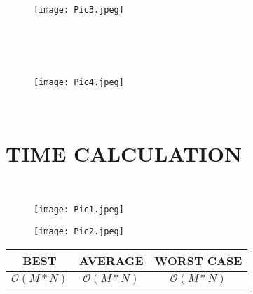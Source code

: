 \documentclass[conference]{IEEEtran}
\begin{document}
        
         



\begin{figure}[htbp]
    \centering
    \texttt{[image: Pic3.jpeg]}
\end{figure}
\\

\\

\\

\begin{figure}[htbp]
    \centering
    \texttt{[image: Pic4.jpeg]}
\end{figure}
 
\\


\section{TIME CALCULATION }\\
\begin{figure}[htbp]
    \centering
    \texttt{[image: Pic1.jpeg]}
\end{figure}

\begin{figure}[htbp]
    \centering
    \texttt{[image: Pic2.jpeg]}
\end{figure}

\begin{center}
 \begin{tabular}{||c c c||} 
 \hline
  BEST & AVERAGE & WORST CASE  \\  
 \hline\hline
 \begin{math} \mathcal{O}(M*N)\end{math} & \begin{math} \mathcal{O}(M*N)\end{math} & \begin{math} \mathcal{O}(M*N)\end{math} \\ 
 \hline
\end{tabular}
\end{center}
\end{document}
